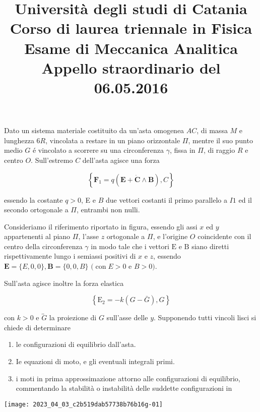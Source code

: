 \documentclass[10pt]{article}
\title{Università degli studi di Catania 
 Corso di laurea triennale in Fisica 
 Esame di Meccanica Analitica 
 Appello straordinario del 06.05.2016 }
\author{}
\date{}
\begin{document}
\maketitle
Dato un sistema materiale costituito da un'asta omogenea \(A C\), di massa \(M\) e lunghezza \(6 R\), vincolata a restare in un piano orizzontale \(\Pi\), mentre il suo punto medio \(G\) é vincolato a scorrere su una circonferenza \(\gamma\), fissa in \(\Pi\), di raggio \(R\) e centro \(O\). Sull'estremo \(C\) dell'asta agisce una forza

\[
\left\{\mathbf{F}_{1}=q(\mathbf{E}+\dot{\mathbf{C}} \wedge \mathbf{B}), C\right\}
\]

essendo la costante \(q>0\), E e \(B\) due vettori costanti il primo parallelo a \(I 1\) ed il secondo ortogonale a \(\Pi\), entrambi non nulli.

Consideriamo il riferimento riportato in figura, essendo gli assi \(x\) ed \(y\) appartenenti al piano \(\Pi\), l'asse \(z\) ortogonale a \(\Pi\), e l'origine \(O\) coincidente con il centro della circonferenza \(\gamma\) in modo tale che i vettori \(\mathrm{E}\) e \(\mathrm{B}\) siano diretti rispettivamente lungo i semiassi positivi di \(x\) e \(z\), essendo \(\mathbf{E}=\{E, 0,0\}, \mathbf{B}=\{0,0, B\}\) \((\operatorname{con} E>0\) e \(B>0)\).

Sull'asta agisce inoltre la forza elastica

\[
\left\{\mathrm{E}_{2}=-k(G-\bar{G}), G\right\}
\]

con \(k>0\) e \(\overleftrightarrow{G}\) la proiezione di \(G\) sull'asse delle \(y\). Supponendo tutti vincoli lisci si chiede di determinare

\begin{enumerate}
  \item le configurazioni di equilibrio dall'asta.

  \item Ie equazioni di moto, e gli eventuali integrali primi.

  \item i moti in prima approssimazione attorno alle configurazioni di equilibrio, commentando la stabilità o instabilità delle suddette configurazioni in

\end{enumerate}

\begin{center}
\texttt{[image: 2023\_04\_03\_c2b519dab57738b76b16g-01]}
\end{center}
\end{document}
